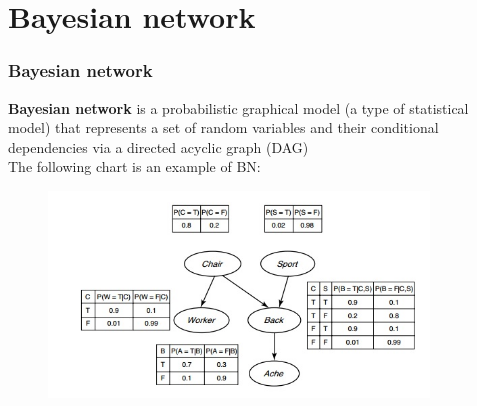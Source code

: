 \documentclass{beamer}
\begin{document}
\section{Bayesian network}
\begin{frame}
\frametitle{Bayesian network}
\textbf{Bayesian network} is a probabilistic graphical model (a type of statistical model)
that represents a set of random variables and their conditional dependencies via a directed acyclic graph (DAG)\\
The following chart is an example of BN:\\
 \begin{figure}
     \includegraphics[width=0.9\textwidth]{bayesian.jpg}

    \end{figure}

\end{frame}
\end{document}
